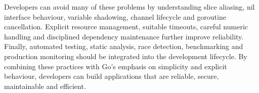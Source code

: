 Developers can avoid many of these problems by understanding slice aliasing, nil interface behaviour, variable shadowing, channel lifecycle and goroutine cancellation. Explicit resource management, suitable timeouts, careful numeric handling and disciplined dependency maintenance further improve reliability.\\

Finally, automated testing, static analysis, race detection, benchmarking and production monitoring should be integrated into the development lifecycle. By combining these practices with Go's emphasis on simplicity and explicit behaviour, developers can build applications that are reliable, secure, maintainable and efficient.

